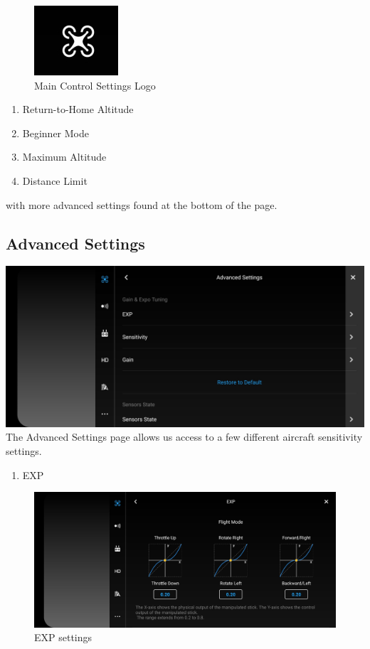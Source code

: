 \documentclass[
]{book}
\providecommand{\tightlist}{%
  \setlength{\itemsep}{0pt}\setlength{\parskip}{0pt}}
\begin{document}
\begin{figure}
\centering
\includegraphics{images/MC/DJI-MClogo.jpg}
\caption{Main Control Settings Logo}
\end{figure}

\begin{enumerate}
\def\labelenumi{\arabic{enumi}.}
\tightlist
\item
  Return-to-Home Altitude
\item
  Beginner Mode
\item
  Maximum Altitude
\item
  Distance Limit
\end{enumerate}

with more advanced settings found at the bottom of the page.

\hypertarget{advanced-settings}{%
\subsection{Advanced Settings}\label{advanced-settings}}

\includegraphics{images/MC/DJI-MC-Advanced-Settings.jpg}
The Advanced Settings page allows us access to a few different aircraft sensitivity settings.

\begin{enumerate}
\def\labelenumi{\arabic{enumi}.}
\tightlist
\item
  EXP
\end{enumerate}

\begin{figure}
\centering
\includegraphics{images/MC/DJI-ExpSettings.jpg}
\caption{EXP settings}
\end{figure}
\end{document}
